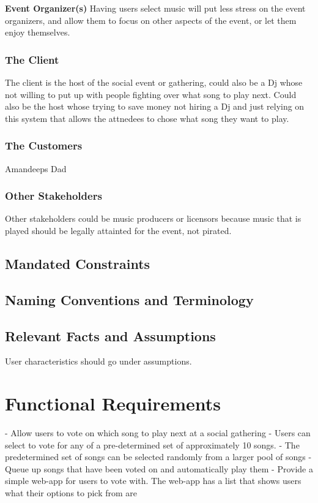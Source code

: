 \documentclass[12pt, titlepage]{article}
\begin{document}
\textbf{Event Organizer(s)}
Having users select music will put less stress on the event organizers, and
allow them to focus on other aspects of the event, or let them enjoy
themselves.

\subsubsection{The Client}
The client is the host of the social event or gathering, could also be a Dj whose not willing to put up with people fighting over what song to play next. Could also be the host whose trying to save money not hiring a Dj and just relying on this system that allows the attnedees to chose what song they want to play.

\subsubsection{The Customers}
Amandeeps Dad

\subsubsection{Other Stakeholders}
Other stakeholders could be music producers or licensors because music that is played should be legally attainted for the event, not pirated.

\subsection{Mandated Constraints}

\subsection{Naming Conventions and Terminology}

\subsection{Relevant Facts and Assumptions}

User characteristics should go under assumptions.

\section{Functional Requirements}

- Allow users to vote on which song to play next at a social gathering
- Users can select to vote for any of a pre-determined set of
  approximately 10 songs.
- The predetermined set of songs can be selected randomly from a larger pool
  of songs
- Queue up songs that have been voted on and automatically play them
- Provide a simple web-app for users to vote with. The web-app has a list that
  shows users what their options to pick from are
\end{document}
